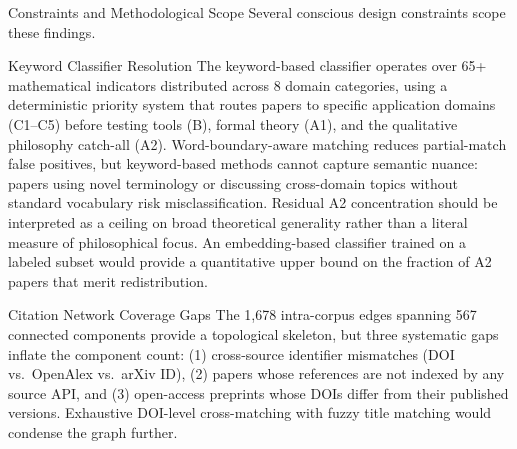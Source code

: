 \documentclass[
  ignorenonframetext,
]{beamer}
\begin{document}
\begin{frame}{Constraints and Methodological Scope}
\protect{}\label{constraints-and-methodological-scope}
Several conscious design constraints scope these findings.

\begin{block}{Keyword Classifier Resolution}
\protect{}\label{keyword-classifier-resolution}
The keyword-based classifier operates over 65+ mathematical indicators
distributed across 8 domain categories, using a deterministic priority
system that routes papers to specific application domains (C1--C5)
before testing tools (B), formal theory (A1), and the qualitative
philosophy catch-all (A2). Word-boundary-aware matching reduces
partial-match false positives, but keyword-based methods cannot capture
semantic nuance: papers using novel terminology or discussing
cross-domain topics without standard vocabulary risk misclassification.
Residual A2 concentration should be interpreted as a ceiling on broad
theoretical generality rather than a literal measure of philosophical
focus. An embedding-based classifier trained on a labeled subset would
provide a quantitative upper bound on the fraction of A2 papers that
merit redistribution.
\end{block}

\begin{block}{Citation Network Coverage Gaps}
\protect{}\label{citation-network-coverage-gaps}
The 1,678 intra-corpus edges spanning 567 connected components provide a
topological skeleton, but three systematic gaps inflate the component
count: (1) cross-source identifier mismatches (DOI vs.~OpenAlex
vs.~arXiv ID), (2) papers whose references are not indexed by any source
API, and (3) open-access preprints whose DOIs differ from their
published versions. Exhaustive DOI-level cross-matching with fuzzy title
matching would condense the graph further.
\end{block}


\end{frame}
\end{document}
